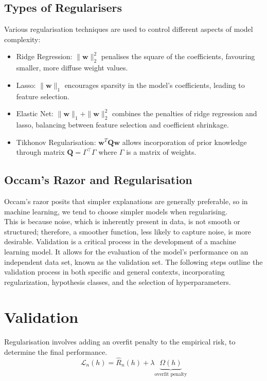\subsection*{Types of Regularisers}
Various regularisation techniques are used to control different aspects of model complexity:
\begin{itemize}
  \item Ridge Regression: \( \|\mathbf{w}\|_2^2 \) penalises the square of the coefficients, favouring smaller, more diffuse weight values.
  \item Lasso: \( \|\mathbf{w}\|_1 \) encourages sparsity in the model's coefficients, leading to feature selection.
  \item Elastic Net: \( \|\mathbf{w}\|_1 + \|\mathbf{w}\|_2^2 \) combines the penalties of ridge regression and lasso, balancing between feature selection and coefficient shrinkage.
  \item Tikhonov Regularisation: \( \mathbf{w}^T\mathbf{Q}\mathbf{w} \) allows incorporation of prior knowledge through matrix \( \mathbf{Q} = \Gamma^\top \Gamma \) where $\Gamma$ is a matrix of weights.
\end{itemize}


\subsection*{Occam's Razor and Regularisation}
Occam's razor posits that simpler explanations are generally preferable, so in machine learning, we tend to choose simpler models when regularising.\\

This is because noise, which is inherently present in data, is not smooth or structured; therefore, a smoother function, less likely to capture noise, is more desirable.
Validation is a critical process in the development of a machine learning model. It allows for the evaluation of the model's performance on an independent data set, known as the validation set. The following steps outline the validation process in both specific and general contexts, incorporating regularization, hypothesis classes, and the selection of hyperparameters.

\section{Validation}
Regularisation involves adding an overfit penalty to the empirical risk, to determine the final performance.
\[\mathcal{L}_n(h)=\widehat{R}_n(h)+\lambda\underbrace{\Omega(h)}_{\text{overfit penalty}}\]

